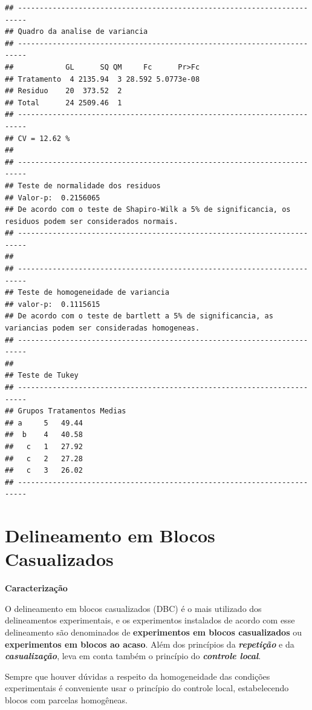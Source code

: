 \documentclass[
]{book}
\begin{document}
\begin{verbatim}
## ------------------------------------------------------------------------
## Quadro da analise de variancia
## ------------------------------------------------------------------------
##            GL      SQ QM     Fc      Pr>Fc
## Tratamento  4 2135.94  3 28.592 5.0773e-08
## Residuo    20  373.52  2                  
## Total      24 2509.46  1                  
## ------------------------------------------------------------------------
## CV = 12.62 %
## 
## ------------------------------------------------------------------------
## Teste de normalidade dos residuos 
## Valor-p:  0.2156065 
## De acordo com o teste de Shapiro-Wilk a 5% de significancia, os residuos podem ser considerados normais.
## ------------------------------------------------------------------------
## 
## ------------------------------------------------------------------------
## Teste de homogeneidade de variancia 
## valor-p:  0.1115615 
## De acordo com o teste de bartlett a 5% de significancia, as variancias podem ser consideradas homogeneas.
## ------------------------------------------------------------------------
## 
## Teste de Tukey
## ------------------------------------------------------------------------
## Grupos Tratamentos Medias
## a     5   49.44 
##  b    4   40.58 
##   c   1   27.92 
##   c   2   27.28 
##   c   3   26.02 
## ------------------------------------------------------------------------
\end{verbatim}

\hypertarget{delineamento-em-blocos-casualizados}{%
\chapter{Delineamento em Blocos Casualizados}\label{delineamento-em-blocos-casualizados}}

\textbf{Caracterização}

O delineamento em blocos casualizados (DBC) é o mais utilizado dos delineamentos experimentais, e os experimentos instalados de acordo com esse delineamento são denominados de \textbf{experimentos em blocos casualizados} ou \textbf{experimentos em blocos ao acaso}. Além dos princípios da \textbf{\emph{repetição}} e da \textbf{\emph{casualização}}, leva em conta também o princípio do \textbf{\emph{controle local}}.

Sempre que houver dúvidas a respeito da homogeneidade das condições experimentais é conveniente usar o princípio do controle local, estabelecendo blocos com parcelas homogêneas.
\end{document}
